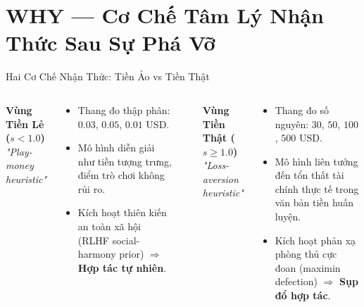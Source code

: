 \documentclass[aspectratio=169,9pt]{beamer}
\begin{document}
\section{WHY — Cơ Chế Tâm Lý Nhận Thức Sau Sự Phá Vỡ}

\begin{frame}{Hai Cơ Chế Nhận Thức: Tiền Ảo vs Tiền Thật}

\begin{columns}[T]

\begin{center}
\textbf{\color{mgood} Vùng Tiền Lẻ ($s < 1.0$)}\\[2pt]
\textit{"Play-money heuristic"}
\end{center}

\vspace{0.3em}
\begin{goodbox}
\footnotesize
\begin{itemize}\setlength\itemsep{3pt}
  \item Thang đo thập phân: $0.03$, $0.05$, $0.01$ USD.
  \item Mô hình diễn giải như tiền tượng trưng, điểm trò chơi không rủi ro.
  \item Kích hoạt thiên kiến an toàn xã hội (RLHF social-harmony prior) $\Rightarrow$ \textbf{Hợp tác tự nhiên}.
\end{itemize}
\end{goodbox}

\vspace{0.4em}
\begin{center}
\end{center}


\begin{center}
\textbf{\color{mbad} Vùng Tiền Thật ($s \ge 1.0$)}\\[2pt]
\textit{"Loss-aversion heuristic"}
\end{center}

\vspace{0.3em}
\begin{badbox}
\footnotesize
\begin{itemize}\setlength\itemsep{3pt}
  \item Thang đo số nguyên: $30$, $50$, $100$, $500$ USD.
  \item Mô hình liên tưởng đến tổn thất tài chính thực tế trong văn bản tiền huấn luyện.
  \item Kích hoạt phản xạ phòng thủ cực đoan (maximin defection) $\Rightarrow$ \textbf{Sụp đổ hợp tác}.
\end{itemize}
\end{badbox}


\end{columns}
\end{frame}
\end{document}
